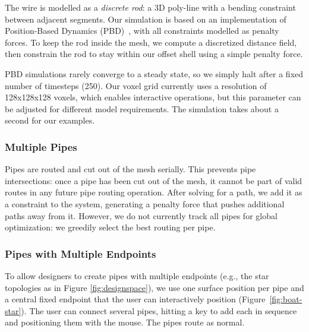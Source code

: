 The wire is modelled as a \emph{discrete rod}: a 3D poly-line with a bending 
constraint between adjacent segments. Our simulation is based on an
implementation of Position-Based Dynamics (PBD)~\cite{Muller07}, with all constraints
modelled as penalty forces. To keep the rod inside the
mesh, we compute a discretized distance field, then constrain the
rod to stay within our offset shell using a simple penalty force.


PBD simulations rarely converge to a steady state, so we simply halt after a fixed number of timesteps (250). Our voxel grid currently uses a resolution of 128x128x128 voxels, which enables interactive operations, but this parameter can be adjusted for different model requirements. The simulation takes about a second for our examples.

\subsubsection{Multiple Pipes}
Pipes are routed and cut out of the mesh serially. This prevents pipe intersections: once a pipe has been cut out of the mesh, it cannot be part of valid routes in any future pipe routing operation. After solving for a path, we add it as a constraint to the system, generating
a penalty force that pushes additional paths away from it.  However, we do not currently track all pipes for global optimization: we greedily select the best routing per pipe. 

\subsubsection{Pipes with Multiple Endpoints}
To allow designers to create pipes with multiple endpoints (e.g., the star topologies as in Figure \ref{fig:designspace}), we use one surface position per pipe and a central fixed endpoint that the user can interactively position (Figure~\ref{fig:boat-star}).  The user can connect several pipes, hitting a key to add each in sequence and positioning them with the mouse.  The pipes route as normal.

